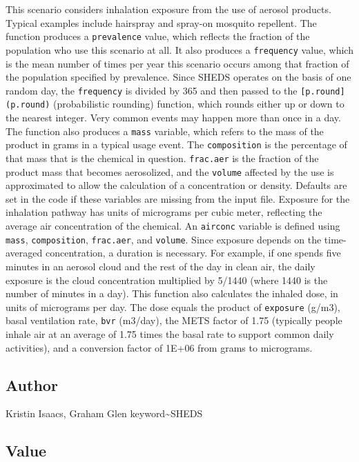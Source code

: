 \documentclass[
]{article}
\begin{document}
This scenario considers inhalation exposure from the use of aerosol
products. Typical examples include hairspray and spray-on mosquito
repellent. The function produces a \texttt{prevalence} value, which
reflects the fraction of the population who use this scenario at all. It
also produces a \texttt{frequency} value, which is the mean number of
times per year this scenario occurs among that fraction of the
population specified by prevalence. Since SHEDS operates on the basis of
one random day, the \texttt{frequency} is divided by 365 and then passed
to the \texttt{{[}p.round{]}(p.round)} (probabilistic rounding)
function, which rounds either up or down to the nearest integer. Very
common events may happen more than once in a day. The function also
produces a \texttt{mass} variable, which refers to the mass of the
product in grams in a typical usage event. The \texttt{composition} is
the percentage of that mass that is the chemical in question.
\texttt{frac.aer} is the fraction of the product mass that becomes
aerosolized, and the \texttt{volume} affected by the use is approximated
to allow the calculation of a concentration or density. Defaults are set
in the code if these variables are missing from the input file. Exposure
for the inhalation pathway has units of micrograms per cubic meter,
reflecting the average air concentration of the chemical. An
\texttt{airconc} variable is defined using \texttt{mass},
\texttt{composition}, \texttt{frac.aer}, and \texttt{volume}. Since
exposure depends on the time-averaged concentration, a duration is
necessary. For example, if one spends five minutes in an aerosol cloud
and the rest of the day in clean air, the daily exposure is the cloud
concentration multiplied by 5/1440 (where 1440 is the number of minutes
in a day). This function also calculates the inhaled dose, in units of
micrograms per day. The dose equals the product of \texttt{exposure}
(g/m3), basal ventilation rate, \texttt{bvr} (m3/day), the METS factor
of 1.75 (typically people inhale air at an average of 1.75 times the
basal rate to support common daily activities), and a conversion factor
of 1E+06 from grams to micrograms.

\hypertarget{author-11}{%
\subsection{Author}\label{author-11}}

Kristin Isaacs, Graham Glen keyword\textasciitilde SHEDS

\hypertarget{value-11}{%
\subsection{Value}\label{value-11}}
\end{document}

